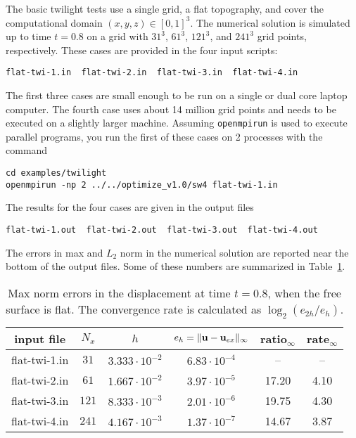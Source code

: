 \documentclass[11pt]{report}
\newcommand{\ub}{{\bf u}}
\begin{document}
The basic twilight tests use a single grid, a flat topography, and cover the computational domain
$(x,y,z)\in[0,1]^3$. The numerical solution is simulated up to time $t=0.8$ on a grid with $31^3$,
$61^3$, $121^3$, and $241^3$ grid points, respectively. These cases are provided in the four input
scripts:
\begin{verbatim}
flat-twi-1.in  flat-twi-2.in  flat-twi-3.in  flat-twi-4.in
\end{verbatim}
The first three cases are small enough to be run on a single or dual core laptop computer. The
fourth case uses about 14 million grid points and needs to be executed on a slightly larger
machine. Assuming \verb+openmpirun+ is used to execute parallel programs, you run the first of these
cases on 2 processes with the command
\begin{verbatim}
cd examples/twilight
openmpirun -np 2 ../../optimize_v1.0/sw4 flat-twi-1.in
\end{verbatim}
The results for the four cases are given in the output files
\begin{verbatim}
flat-twi-1.out  flat-twi-2.out  flat-twi-3.out  flat-twi-4.out
\end{verbatim}
The errors in max and $L_2$ norm in the numerical solution are reported near the bottom of the
output files. Some of these numbers are summarized in Table~\ref{tab:twi-err}.
\begin{table}
\begin{center}
\begin{tabular}{| c | c | c | c | c  | c | }
\hline
input file & $N_x$ & $h$ & $e_h=\| \ub - \ub_{ex}\|_\infty$ & ratio$_\infty$ & rate$_\infty$ \\ \hline
flat-twi-1.in & $31$  & $3.333\cdot 10^{-2}$  & $6.83\cdot 10^{-4}$ & --   & --   \\ \hline
flat-twi-2.in & $61$  & $1.667\cdot 10^{-2}$  & $3.97\cdot 10^{-5}$ & 17.20 & 4.10 \\ \hline
flat-twi-3.in & $121$ & $8.333\cdot 10^{-3}$  & $2.01\cdot 10^{-6}$ & 19.75 & 4.30 \\ \hline
flat-twi-4.in & $241$ & $4.167\cdot 10^{-3}$  & $1.37\cdot 10^{-7}$ & 14.67 & 3.87 \\ \hline
\end{tabular}
\caption{Max norm errors in the displacement at time $t=0.8$, when the free
  surface is flat. The convergence rate is calculated as $\log_2(e_{2h}/e_h)$.}
\label{tab:twi-err}
\end{center}
\end{table}
\end{document}
